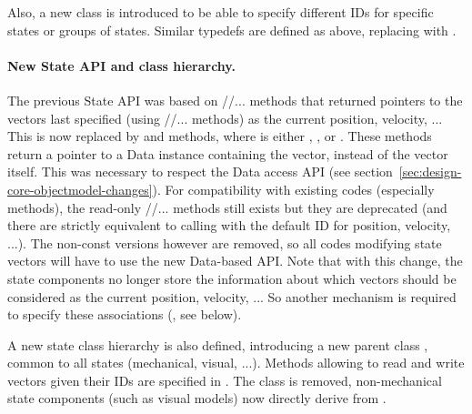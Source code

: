 Also, a new class  is introduced to be able to specify different IDs for specific states or groups of states. Similar typedefs are defined as above, replacing  with .

\paragraph{New State API and class hierarchy.}
The previous State API was based on //... methods that returned pointers to the vectors last specified (using //... methods) as the current position, velocity, ...
This is now replaced by  and  methods, where  is either , , or .
These methods return a pointer to a Data instance containing the vector, instead of the vector itself.
This was necessary to respect the Data access API (see section~\ref{sec:design-core-objectmodel-changes}).
For compatibility with existing codes (especially  methods), the read-only //... methods still exists but they are deprecated (and there are strictly equivalent to calling  with the default ID for position, velocity, ...).
The non-const versions however are removed, so all codes modifying state vectors will have to use the new Data-based API.
Note that with this change, the state components no longer store the information about which vectors should be considered as the current position, velocity, ...
So another mechanism is required to specify these associations (, see below).

A new state class hierarchy is also defined,  introducing a new parent class , common to all states (mechanical, visual, ...).
Methods allowing to read and write vectors given their IDs are specified in .
The  class is removed, non-mechanical state components (such as visual models) now directly derive from .


